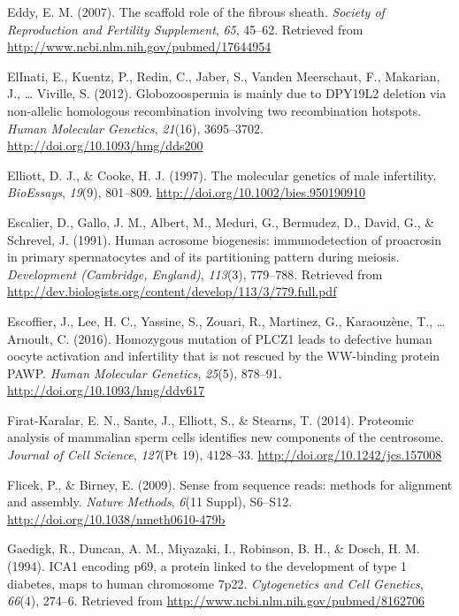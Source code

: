 \documentclass[12pt,twoside]{reedthesis}
\theoremstyle{definition}
\theoremstyle{definition}
\theoremstyle{remark}
\begin{document}
  \hypertarget{ref-Eddy2007}{}
  Eddy, E. M. (2007). The scaffold role of the fibrous sheath.
  \emph{Society of Reproduction and Fertility Supplement}, \emph{65},
  45--62. Retrieved from \url{http://www.ncbi.nlm.nih.gov/pubmed/17644954}
  
  \hypertarget{ref-ElInati2012}{}
  ElInati, E., Kuentz, P., Redin, C., Jaber, S., Vanden Meerschaut, F.,
  Makarian, J., \ldots{} Viville, S. (2012). Globozoospermia is mainly due
  to DPY19L2 deletion via non-allelic homologous recombination involving
  two recombination hotspots. \emph{Human Molecular Genetics},
  \emph{21}(16), 3695--3702. \url{http://doi.org/10.1093/hmg/dds200}
  
  \hypertarget{ref-Elliott1997}{}
  Elliott, D. J., \& Cooke, H. J. (1997). The molecular genetics of male
  infertility. \emph{BioEssays}, \emph{19}(9), 801--809.
  \url{http://doi.org/10.1002/bies.950190910}
  
  \hypertarget{ref-Escalier1991}{}
  Escalier, D., Gallo, J. M., Albert, M., Meduri, G., Bermudez, D., David,
  G., \& Schrevel, J. (1991). Human acrosome biogenesis: immunodetection
  of proacrosin in primary spermatocytes and of its partitioning pattern
  during meiosis. \emph{Development (Cambridge, England)}, \emph{113}(3),
  779--788. Retrieved from
  \url{http://dev.biologists.org/content/develop/113/3/779.full.pdf}
  
  \hypertarget{ref-Escoffier2016}{}
  Escoffier, J., Lee, H. C., Yassine, S., Zouari, R., Martinez, G.,
  Karaouzène, T., \ldots{} Arnoult, C. (2016). Homozygous mutation of
  PLCZ1 leads to defective human oocyte activation and infertility that is
  not rescued by the WW-binding protein PAWP. \emph{Human Molecular
  Genetics}, \emph{25}(5), 878--91.
  \url{http://doi.org/10.1093/hmg/ddv617}
  
  \hypertarget{ref-Firat-Karalar2014}{}
  Firat-Karalar, E. N., Sante, J., Elliott, S., \& Stearns, T. (2014).
  Proteomic analysis of mammalian sperm cells identifies new components of
  the centrosome. \emph{Journal of Cell Science}, \emph{127}(Pt 19),
  4128--33. \url{http://doi.org/10.1242/jcs.157008}
  
  \hypertarget{ref-Flicek2009}{}
  Flicek, P., \& Birney, E. (2009). Sense from sequence reads: methods for
  alignment and assembly. \emph{Nature Methods}, \emph{6}(11 Suppl),
  S6--S12. \url{http://doi.org/10.1038/nmeth0610-479b}
  
  \hypertarget{ref-Gaedigk1994}{}
  Gaedigk, R., Duncan, A. M., Miyazaki, I., Robinson, B. H., \& Dosch, H.
  M. (1994). ICA1 encoding p69, a protein linked to the development of
  type 1 diabetes, maps to human chromosome 7p22. \emph{Cytogenetics and
  Cell Genetics}, \emph{66}(4), 274--6. Retrieved from
  \url{http://www.ncbi.nlm.nih.gov/pubmed/8162706}
  
\end{document}
